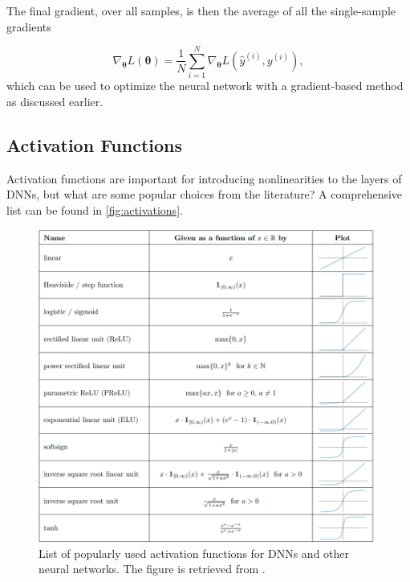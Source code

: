 The final gradient, over all samples, is then the average of all the single-sample gradients

\begin{equation}\label{eq:averageGradient}
    \nabla_{\boldsymbol{\theta}} L(\boldsymbol{\theta}) = \frac{1}{N}\sum_{i=1}^N \nabla_{\boldsymbol{\theta}} L(\hat{y}^{(i)}, y^{(i)}),
\end{equation}
which can be used to optimize the neural network with a gradient-based method as discussed earlier.

\subsection{Activation Functions}\label{sec:Activation Functions}

Activation functions are important for introducing nonlinearities to the layers of DNNs, but what are some popular choices from the literature? A comprehensive list can be found in \cref{fig:activations}.

\begin{figure}[H]
    \centering
    \includegraphics[width=12cm]{latex/figures/activations.png}
    \caption{List of popularly used activation functions for DNNs and other neural networks. The figure is retrieved from \citet{DBLP:journals/corr/abs-2105-04026}.}
    \label{fig:activation function}
\end{figure}

